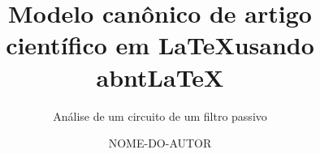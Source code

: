 \documentclass[oneside]{abntlatex}
\title        {Modelo canônico de artigo científico em \LaTeX usando abnt\LaTeX}
\subtitle     {Análise de um circuito de um filtro passivo}
\author       {NOME-DO-AUTOR}
\date         {\the\year}
\begin{document}
  \pretext%
  \maketitle %

  \backcover%
  \intercatalog%
  \begin{abstract}%
    \lipsum[1-1]
  \end{abstract}
  \listoffigures%
  \listoftables%
  \tableofcontents\cleardoublepage%

  \maintext%

  

  

  

  \backtext%
\end{document}
